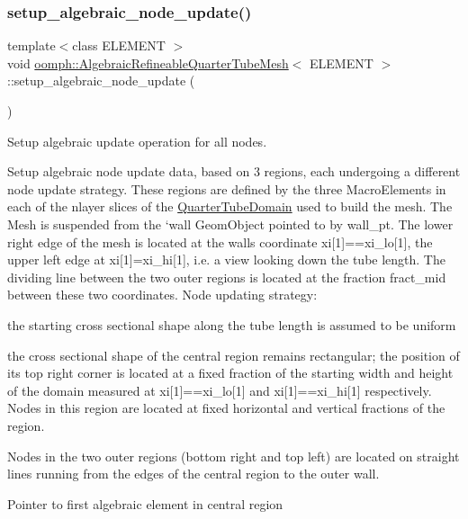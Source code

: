 \subsubsection{\texorpdfstring{setup\+\_\+algebraic\+\_\+node\+\_\+update()}{setup\_algebraic\_node\_update()}}
{\footnotesize\ttfamily template$<$class E\+L\+E\+M\+E\+NT $>$ \\
void \hyperlink{classoomph_1_1AlgebraicRefineableQuarterTubeMesh}{oomph\+::\+Algebraic\+Refineable\+Quarter\+Tube\+Mesh}$<$ E\+L\+E\+M\+E\+NT $>$\+::setup\+\_\+algebraic\+\_\+node\+\_\+update (\begin{DoxyParamCaption}{ }\end{DoxyParamCaption})\hspace{0.3cm}{\ttfamily [private]}}



Setup algebraic update operation for all nodes. 

Setup algebraic node update data, based on 3 regions, each undergoing a different node update strategy. These regions are defined by the three Macro\+Elements in each of the nlayer slices of the \hyperlink{classoomph_1_1QuarterTubeDomain}{Quarter\+Tube\+Domain} used to build the mesh. The Mesh is suspended from the `wall\textquotesingle{} Geom\+Object pointed to by wall\+\_\+pt. The lower right edge of the mesh is located at the wall\textquotesingle{}s coordinate xi\mbox{[}1\mbox{]}==xi\+\_\+lo\mbox{[}1\mbox{]}, the upper left edge at xi\mbox{[}1\mbox{]}=xi\+\_\+hi\mbox{[}1\mbox{]}, i.\+e. a view looking down the tube length. The dividing line between the two outer regions is located at the fraction fract\+\_\+mid between these two coordinates. Node updating strategy\+:
\begin{DoxyItemize}
\item the starting cross sectional shape along the tube length is assumed to be uniform
\item the cross sectional shape of the central region remains rectangular; the position of its top right corner is located at a fixed fraction of the starting width and height of the domain measured at xi\mbox{[}1\mbox{]}==xi\+\_\+lo\mbox{[}1\mbox{]} and xi\mbox{[}1\mbox{]}==xi\+\_\+hi\mbox{[}1\mbox{]} respectively. Nodes in this region are located at fixed horizontal and vertical fractions of the region.
\item Nodes in the two outer regions (bottom right and top left) are located on straight lines running from the edges of the central region to the outer wall. 
\end{DoxyItemize}Pointer to first algebraic element in central region 

